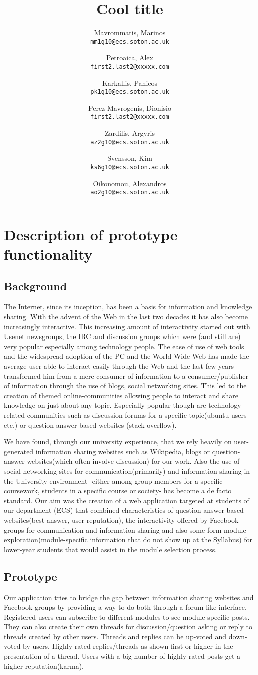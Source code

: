 \documentclass[12pt,a4paper,titlepage]{article}
\author{
  Mavrommatis, Marinos\\ 
\texttt{mm1g10@ecs.soton.ac.uk}
\and
Petroaica, Alex\\ 
\texttt{first2.last2@xxxxx.com}
\and
Karkallis, Panicos\\ 
\texttt{pk1g10@ecs.soton.ac.uk}
\and
Perez-Mavrogenis, Dionisio\\
 \texttt{first2.last2@xxxxx.com}
\and
Zardilis, Argyris\\
 \texttt{az2g10@ecs.soton.ac.uk}
\and
Svensson, Kim\\
 \texttt{ks6g10@ecs.soton.ac.uk}
\and
Oikonomou, Alexandros\\
 \texttt{ao2g10@ecs.soton.ac.uk}
}
\title{Cool title}
\begin{document}
\maketitle

\section{Description of prototype functionality}
\subsection{Background}
The Internet, since its inception, has been a basis for information and knowledge sharing. With the advent of the Web in the last two decades it has also become increasingly interactive. This increasing amount of interactivity started out with Usenet newsgroups, the IRC and discussion groups which were (and still are) very popular especially among technology people. The ease of use of web tools and the widespread adoption of the PC and the World Wide Web has made the average user able to interact easily through the Web and the last few years transformed him from a mere consumer of information to a consumer/publisher of information through the use of blogs, social networking sites.  This led to the creation of themed online-communities allowing people to interact and share knowledge on just about any topic. Especially popular though are technology related communities such as discussion forums for a specific topic(ubuntu users etc.) or question-answer based websites (stack overflow).

We have found, through our university experience, that we rely heavily on user-generated information sharing websites such as Wikipedia, blogs or question-answer websites(which often involve discussion) for our work. Also the use of social networking sites for communication(primarily) and information sharing in the University environment -either among group members for a specific coursework, students in a specific course or society- has become a de facto standard. Our aim was the creation of a web application targeted at students of our department (ECS) that combined characteristics of question-answer based websites(best answer, user reputation), the interactivity offered by Facebook groups for communication and information sharing and also some form module exploration(module-specific information that do not show up at the Syllabus) for lower-year students that would assist in the module selection process.
\subsection{Prototype}
Our application tries to bridge the gap between information sharing websites and Facebook groups by providing a way to do both through a forum-like interface.  Registered users can subscribe to different modules to see module-specific posts. They can also create their own threads for discussion/question asking or reply to threads created by other users. Threads and replies can be up-voted and down-voted by users. Highly rated replies/threads as shown first or higher in the presentation of a thread.  Users with a big number of highly rated posts get a higher reputation(karma).
\end{document}
